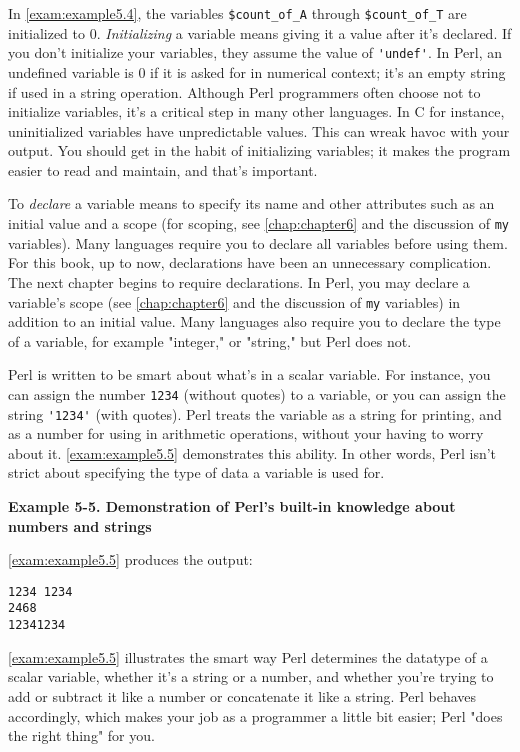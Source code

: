 In \autoref{exam:example5.4}, the variables \verb|$count_of_A| through \verb|$count_of_T| are initialized to 0. \textit{Initializing} a variable means giving it a value after it's declared. If you don't initialize your variables, they assume the value of \verb|'undef'|. In Perl, an undefined variable is 0 if it is asked for in numerical context; it's an empty string if used in a string operation. Although Perl programmers often choose not to initialize variables, it's a critical step in many other languages. In C for instance, uninitialized variables have unpredictable values. This can wreak havoc with your output. You should get in the habit of initializing variables; it makes the program easier to read and maintain, and that's important.

To \textit{declare} a variable means to specify its name and other attributes such as an initial value and a scope (for scoping, see \autoref{chap:chapter6} and the discussion of \verb|my| variables). Many languages require you to declare all variables before using them. For this book, up to now, declarations have been an unnecessary complication. The next chapter begins to require declarations. In Perl, you may declare a variable's scope (see \autoref{chap:chapter6} and the discussion of \verb|my| variables) in addition to an initial value.  Many languages also require you to declare the type of a variable, for example "integer," or "string," but Perl does not.

Perl is written to be smart about what's in a scalar variable. For instance, you can assign the number \verb|1234| (without quotes) to a variable, or you can assign the string \verb|'1234'| (with quotes). Perl treats the variable as a string for printing, and as a number for using in arithmetic operations, without your having to worry about it. \autoref{exam:example5.5} demonstrates this ability. In other words, Perl isn't strict about specifying the type of data a variable is used for. 

\textbf{Example 5-5. Demonstration of Perl's built-in knowledge about numbers and strings}


\autoref{exam:example5.5} produces the output:

\begin{lstlisting}
1234 1234
2468
12341234
\end{lstlisting}

\autoref{exam:example5.5} illustrates the smart way Perl determines the datatype of a scalar variable, whether it's a string or a number, and whether you're trying to add or subtract it like a number or concatenate it like a string. Perl behaves accordingly, which makes your job as a programmer a little bit easier; Perl "does the right thing" for you.

